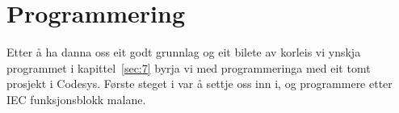 \chapter{Programmering}
\thispagestyle{fancy}
Etter å ha danna oss eit godt grunnlag og eit bilete av korleis vi ynskja programmet i kapittel~\ref{sec:7} 
byrja vi med programmeringa med eit tomt prosjekt i \gls{Codesys}. Første steget i var å 
settje oss inn i, og programmere etter \gls{IEC} funksjonsblokk malane.


